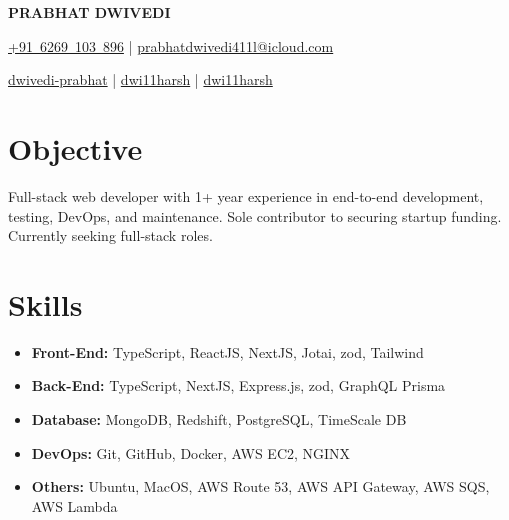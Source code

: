 \documentclass[a4paper,11pt]{article}
\newcommand{\resumeItem}[2]{
  \item{
    \textbf{#1}{\hspace{0.5mm}#2 \vspace{-0.5mm}}
  }
}
\newcommand{\resumeSubItem}[2]{\resumeItem{#1}{#2}\vspace{-4pt}}
\newcommand{\resumeHeadingSkillStart}{\begin{itemize}[leftmargin=*,itemsep=1.7mm, rightmargin=2ex]}
\newcommand{\resumeHeadingSkillEnd}{\end{itemize}\vspace{-1mm}}
\newcommand{\socialicon}[1]{\raisebox{-0.05em}{\resizebox{!}{1em}{#1}}}
\newcommand{\ieeeicon}[1]{\raisebox{-0.3em}{\resizebox{!}{1.3em}{#1}}}
\newcommand{\headerfontiii}{\fontfamily{ppl}\selectfont} %
\begin{document}
\headerfontiii

\begin{center}
    {\huge\textbf{PRABHAT DWIVEDI}}
\end{center}
\vspace{-1mm}

\begin{center}
    \small{
    \mbox{\href{tel:+91-6269-103-896}{+91 6269 103 896}} | \href{mailto:prabhatdwivedi411l@icloud.com}{prabhatdwivedi411l@icloud.com}
    }
\end{center}
\vspace{-6mm}

\begin{center}
    \small{
    \socialicon{\faLinkedin} \href{https://www.linkedin.com/in/dwivedi-prabhat/}{dwivedi-prabhat} | 
    \socialicon{\faGithub} \href{https://github.com/dwi11harsh}{dwi11harsh} | 
    \socialicon{\faTwitter} \href{https://twitter.com/dwi11harsh?t=oQoZW9AAaMQaDwtQTmUj_w&s=09}{dwi11harsh}
    }
\end{center}
\vspace{-4.9mm}

\vspace{2mm}

\section{\textbf{Objective}}
\vspace{1mm}
\small{
Full-stack web developer with 1+ year experience in end-to-end development, testing, DevOps, and maintenance. Sole contributor to securing startup funding. Currently seeking full-stack roles.
}
\vspace{-1mm}

\section{\textbf{Skills}}
\vspace{1mm}
 \resumeHeadingSkillStart
  \resumeSubItem{Front-End: }
    {TypeScript, ReactJS, NextJS, Jotai, zod, Tailwind}
  \resumeSubItem{Back-End: }
    {TypeScript, NextJS, Express.js, zod, GraphQL Prisma}
  \resumeSubItem{Database: }
    {MongoDB, Redshift, PostgreSQL, TimeScale DB}
  \resumeSubItem{DevOps: }
    {Git, GitHub, Docker, AWS EC2, NGINX}
  \resumeSubItem{Others: }
    {Ubuntu, MacOS, AWS Route 53, AWS API Gateway, AWS SQS, AWS Lambda}
 \resumeHeadingSkillEnd
\end{document}
